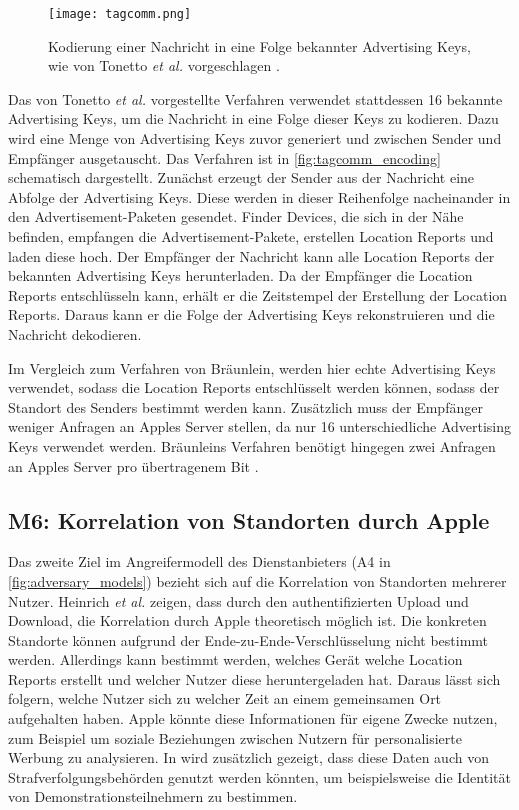 \begin{figure}[ht]
  \centering
  \texttt{[image: tagcomm.png]}
  \caption{Kodierung einer Nachricht in eine Folge bekannter Advertising Keys, wie von Tonetto \textit{et al.} vorgeschlagen \cite{Tonetto_FindMy}.}
  \label{fig:tagcomm_encoding}
\end{figure}
Das von Tonetto \textit{et al.} \cite{Tonetto_FindMy} vorgestellte Verfahren verwendet stattdessen 16 bekannte Advertising Keys, um die Nachricht in eine Folge dieser Keys zu kodieren.
Dazu wird eine Menge von Advertising Keys zuvor generiert und zwischen Sender und Empfänger ausgetauscht.
Das Verfahren ist in \autoref{fig:tagcomm_encoding} schematisch dargestellt.
Zunächst erzeugt der Sender aus der Nachricht eine Abfolge der Advertising Keys.
Diese werden in dieser Reihenfolge nacheinander in den Advertisement-Paketen gesendet.
Finder Devices, die sich in der Nähe befinden, empfangen die Advertisement-Pakete, erstellen Location Reports und laden diese hoch.
Der Empfänger der Nachricht kann alle Location Reports der bekannten Advertising Keys herunterladen.
Da der Empfänger die Location Reports entschlüsseln kann, erhält er die Zeitstempel der Erstellung der Location Reports.
Daraus kann er die Folge der Advertising Keys rekonstruieren und die Nachricht dekodieren.

Im Vergleich zum Verfahren von Bräunlein, werden hier echte Advertising Keys verwendet, sodass die Location Reports entschlüsselt werden können, sodass der Standort des Senders bestimmt werden kann.
Zusätzlich muss der Empfänger weniger Anfragen an Apples Server stellen, da nur 16 unterschiedliche Advertising Keys verwendet werden.
Bräunleins Verfahren benötigt hingegen zwei Anfragen an Apples Server pro übertragenem Bit \cite{braeunlein_sendmy}.


\subsection[M6]{M6: Korrelation von Standorten durch Apple}
\label{missbrauch:6}

Das zweite Ziel im Angreifermodell des Dienstanbieters (A4 in \autoref{fig:adversary_models}) bezieht sich auf die Korrelation von Standorten mehrerer Nutzer.
Heinrich \textit{et al.} \cite{Heinrich_FindMy} zeigen, dass durch den authentifizierten Upload und Download, die Korrelation durch Apple theoretisch möglich ist.
Die konkreten Standorte können aufgrund der Ende-zu-Ende-Verschlüsselung nicht bestimmt werden.
Allerdings kann bestimmt werden, welches Gerät welche Location Reports erstellt und welcher Nutzer diese heruntergeladen hat.
Daraus lässt sich folgern, welche Nutzer sich zu welcher Zeit an einem gemeinsamen Ort aufgehalten haben.
Apple könnte diese Informationen für eigene Zwecke nutzen, zum Beispiel um soziale Beziehungen zwischen Nutzern für personalisierte Werbung zu analysieren.
In \cite{Heinrich_FindMy} wird zusätzlich gezeigt, dass diese Daten auch von Strafverfolgungsbehörden genutzt werden könnten, um beispielsweise die Identität von Demonstrationsteilnehmern zu bestimmen.

